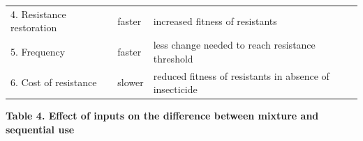 \documentclass[11pt,]{article}
\begin{document}
\begin{longtable}[]{@{}lll@{}}
\begin{minipage}[t]{0.27\columnwidth}\raggedright\strut
4. Resistance restoration\strut
\end{minipage} & \begin{minipage}[t]{0.12\columnwidth}\raggedright\strut
faster\strut
\end{minipage} & \begin{minipage}[t]{0.52\columnwidth}\raggedright\strut
increased fitness of resistants\strut
\end{minipage}\tabularnewline
\begin{minipage}[t]{0.27\columnwidth}\raggedright\strut
5. Frequency\strut
\end{minipage} & \begin{minipage}[t]{0.12\columnwidth}\raggedright\strut
faster\strut
\end{minipage} & \begin{minipage}[t]{0.52\columnwidth}\raggedright\strut
less change needed to reach resistance threshold\strut
\end{minipage}\tabularnewline
\begin{minipage}[t]{0.27\columnwidth}\raggedright\strut
6. Cost of resistance\strut
\end{minipage} & \begin{minipage}[t]{0.12\columnwidth}\raggedright\strut
slower\strut
\end{minipage} & \begin{minipage}[t]{0.52\columnwidth}\raggedright\strut
reduced fitness of resistants in absence of insecticide\strut
\end{minipage}\tabularnewline
\bottomrule
\end{longtable}

\pagebreak

\textbf{Table 4. Effect of inputs on the difference between mixture and
sequential use}
\end{document}
